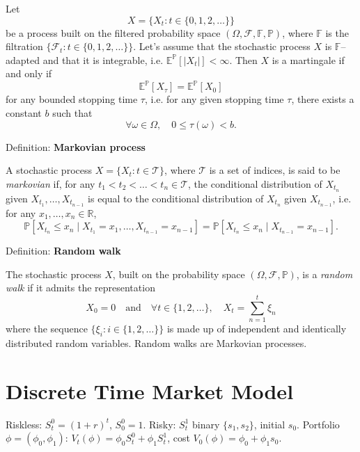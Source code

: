 \documentclass[12pt,a4paper]{article}
\begin{document}
Let
$$X = \{X_t : t \in \{0, 1, 2, \ldots\}\}$$
be a process built on the filtered probability space $(\Omega, \mathcal{F}, \mathbb{F}, \mathbb{P})$, where $\mathbb{F}$ is the filtration $\{\mathcal{F}_t : t \in \{0, 1, 2, \ldots\}\}$. Let's assume that the stochastic process $X$ is $\mathbb{F}$--adapted and that it is integrable, i.e. $\mathbb{E}^{\mathbb{P}}[|X_t|] < \infty$. Then $X$ is a martingale if and only if
$$\mathbb{E}^{\mathbb{P}}[X_{\tau}] = \mathbb{E}^{\mathbb{P}}[X_0]$$
for any bounded stopping time $\tau$, i.e. for any given stopping time $\tau$, there exists a constant $b$ such that
$$\forall \omega \in \Omega, \quad 0 \leq \tau(\omega) < b.$$
\vspace{0.5em}

Definition: \textbf{Markovian process}
\vspace{0.5em}

A stochastic process $X = \{X_t : t \in \mathcal{T}\}$, where $\mathcal{T}$ is a set of indices, is said to be \textit{markovian} if, for any $t_1 < t_2 < \ldots < t_n \in \mathcal{T}$, the conditional distribution of $X_{t_n}$ given $X_{t_1}, \ldots, X_{t_{n-1}}$ is equal to the conditional distribution of $X_{t_n}$ given $X_{t_{n-1}}$, i.e. for any $x_1, \ldots, x_n \in \mathbb{R}$,
$$\mathbb{P}[X_{t_n} \leq x_n \mid X_{t_1} = x_1, \ldots, X_{t_{n-1}} = x_{n-1}] = \mathbb{P}[X_{t_n} \leq x_n \mid X_{t_{n-1}} = x_{n-1}].$$
\vspace{0.5em}

Definition: \textbf{Random walk}
\vspace{0.5em}

The stochastic process $X$, built on the probability space $(\Omega, \mathcal{F}, \mathbb{P})$, is a \textit{random walk} if it admits the representation
$$X_0 = 0 \quad \text{and} \quad \forall t \in \{1, 2, \ldots\}, \quad X_t = \sum_{n=1}^{t} \xi_n$$
where the sequence $\{\xi_i : i \in \{1, 2, \ldots\}\}$ is made up of independent and identically distributed random variables. Random walks are Markovian processes.
\vspace{0.5em}


\section{Discrete Time Market Model}

Riskless: $S_t^0 = (1+r)^t$, $S_0^0 = 1$. Risky: $S_t^1$ binary $\{s_1, s_2\}$, initial $s_0$. Portfolio $\phi = (\phi_0, \phi_1)$: $V_t(\phi) = \phi_0 S_t^0 + \phi_1 S_t^1$, cost $V_0(\phi) = \phi_0 + \phi_1 s_0$.
\vspace{1em}
\end{document}
